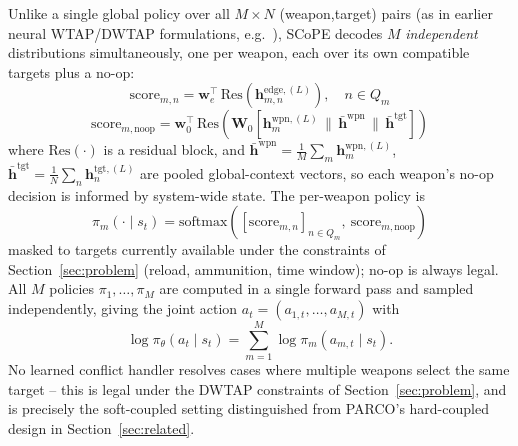 \documentclass[smallcondensed]{svjour3}
\begin{document}
Unlike a single global policy over all $M \times N$ (weapon,target) pairs (as in earlier neural WTAP/DWTAP formulations, e.g.~\cite{na2023weapon}), SCoPE decodes $M$ \emph{independent} distributions simultaneously, one per weapon, each over its own compatible targets plus a no-op:
\begin{equation}
\text{score}_{m,n} = \bm{w}_e^\top \, \text{Res}\!\left(\bm{h}_{m,n}^{\text{edge},(L)}\right), \quad n \in Q_m
\end{equation}
\begin{equation}
\text{score}_{m,\text{noop}} = \bm{w}_0^\top \, \text{Res}\!\left(\bm{W}_0\left[\bm{h}_m^{\text{wpn},(L)} \,\|\, \bar{\bm{h}}^{\text{wpn}} \,\|\, \bar{\bm{h}}^{\text{tgt}}\right]\right)
\end{equation}
where $\text{Res}(\cdot)$ is a residual block, and $\bar{\bm{h}}^{\text{wpn}} = \frac{1}{M}\sum_m \bm{h}_m^{\text{wpn},(L)}$, $\bar{\bm{h}}^{\text{tgt}} = \frac{1}{N}\sum_n \bm{h}_n^{\text{tgt},(L)}$ are pooled global-context vectors, so each weapon's no-op decision is informed by system-wide state. The per-weapon policy is
\begin{equation}
\label{eq:parallel-policy}
\pi_m(\cdot \mid s_t) = \text{softmax}\!\left(\left[\text{score}_{m,n}\right]_{n \in Q_m},\ \text{score}_{m,\text{noop}}\right)
\end{equation}
masked to targets currently available under the constraints of Section~\ref{sec:problem} (reload, ammunition, time window); no-op is always legal. All $M$ policies $\pi_1, \ldots, \pi_M$ are computed in a single forward pass and sampled independently, giving the joint action $a_t = (a_{1,t}, \ldots, a_{M,t})$ with
\begin{equation}
\log \pi_\theta(a_t \mid s_t) = \sum_{m=1}^{M} \log \pi_m(a_{m,t} \mid s_t).
\end{equation}
No learned conflict handler resolves cases where multiple weapons select the same target -- this is legal under the DWTAP constraints of Section~\ref{sec:problem}, and is precisely the soft-coupled setting distinguished from PARCO's hard-coupled design in Section~\ref{sec:related}.
\end{document}
